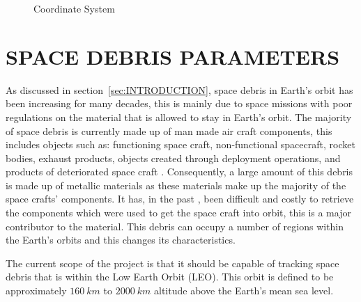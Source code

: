 \documentclass[11pt]{witseiepaper}
\begin{document}
\begin{bibunit}[witseie]
\begin{figure}
\caption{Coordinate System}
\label{fig:CoordinateSystem}
\end{figure}


\section{SPACE DEBRIS PARAMETERS} \label{sec:SpaceDebrisParameters}
As discussed in section~\ref{sec:INTRODUCTION}, space debris in Earth's orbit has been increasing for many decades, this is mainly due to space missions with poor regulations on the material that is allowed to stay in Earth's orbit.
The majority of space debris is currently made up of man made air craft components, this includes objects such as: functioning space craft, non-functional spacecraft, rocket bodies, exhaust products, objects created through deployment operations, and products of deteriorated space craft \cite{OrbitalDebrisTechnicalAssessment}.
Consequently, a large amount of this debris is made up of metallic materials as these materials make up the majority of the space crafts' components.
It has, in the past \cite{Spacex}, been difficult and costly to retrieve the components which were used to get the space craft into orbit, this is a major contributor to the material.
This debris can occupy a number of regions within the Earth's orbits and this changes its characteristics.

The current scope of the project is that it should be capable of tracking space debris that is within the Low Earth Orbit (LEO). This orbit is defined to be approximately $160~km$ to $2000~km$ altitude above the Earth's mean sea level.



\end{bibunit}
\end{document}
